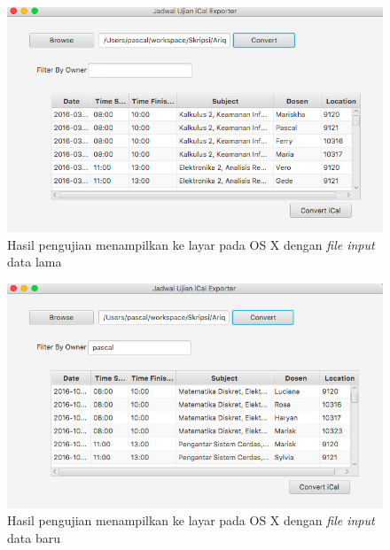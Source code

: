 		\begin{figure}[H]
			\centering
			\includegraphics[scale=0.5]{Gambar/Menampilkan-ke-layar-on-Mac}
			\caption{Hasil pengujian menampilkan ke layar pada OS X dengan \textit{file input} data lama}
			\label{fig:MenampilkankelayaronMac}
			\end{figure}
		
		\begin{figure}[H]
			\centering
			\includegraphics[scale=0.5]{Gambar/Menampilkan-ke-Layar-Data-baru-on-Mac}
			\caption{Hasil pengujian menampilkan ke layar pada OS X dengan \textit{file input} data baru}
			\label{fig:MenampilkankelayarDatabaruonMac}
			\end{figure}
			

